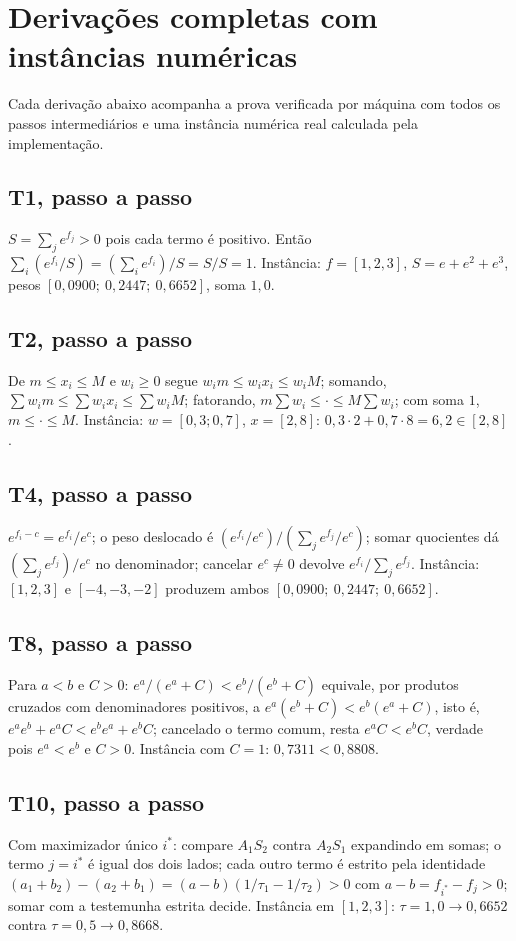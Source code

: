 \section{Derivações completas com instâncias numéricas}
Cada derivação abaixo acompanha a prova verificada por máquina com todos os passos intermediários e uma instância numérica real calculada pela implementação.
\subsection{T1, passo a passo}
$S=\sum_j e^{f_j}>0$ pois cada termo é positivo. Então $\sum_i(e^{f_i}/S)=(\sum_i e^{f_i})/S=S/S=1$. Instância: $f=[1,2,3]$, $S=e+e^2+e^3$, pesos $[0{,}0900;\ 0{,}2447;\ 0{,}6652]$, soma $1{,}0$.
\subsection{T2, passo a passo}
De $m\leq x_i\leq M$ e $w_i\geq0$ segue $w_im\leq w_ix_i\leq w_iM$; somando, $\sum w_im\leq\sum w_ix_i\leq\sum w_iM$; fatorando, $m\sum w_i\leq\cdot\leq M\sum w_i$; com soma $1$, $m\leq\cdot\leq M$. Instância: $w=[0{,}3;0{,}7]$, $x=[2,8]$: $0{,}3\cdot2+0{,}7\cdot8=6{,}2\in[2,8]$.
\subsection{T4, passo a passo}
$e^{f_i-c}=e^{f_i}/e^c$; o peso deslocado é $(e^{f_i}/e^c)/(\sum_je^{f_j}/e^c)$; somar quocientes dá $(\sum_je^{f_j})/e^c$ no denominador; cancelar $e^c\neq0$ devolve $e^{f_i}/\sum_je^{f_j}$. Instância: $[1,2,3]$ e $[-4,-3,-2]$ produzem ambos $[0{,}0900;\ 0{,}2447;\ 0{,}6652]$.
\subsection{T8, passo a passo}
Para $a<b$ e $C>0$: $e^a/(e^a+C)<e^b/(e^b+C)$ equivale, por produtos cruzados com denominadores positivos, a $e^a(e^b+C)<e^b(e^a+C)$, isto é, $e^ae^b+e^aC<e^be^a+e^bC$; cancelado o termo comum, resta $e^aC<e^bC$, verdade pois $e^a<e^b$ e $C>0$. Instância com $C=1$: $0{,}7311<0{,}8808$.
\subsection{T10, passo a passo}
Com maximizador único $i^*$: compare $A_1S_2$ contra $A_2S_1$ expandindo em somas; o termo $j=i^*$ é igual dos dois lados; cada outro termo é estrito pela identidade $(a_1+b_2)-(a_2+b_1)=(a-b)(1/\tau_1-1/\tau_2)>0$ com $a-b=f_{i^*}-f_j>0$; somar com a testemunha estrita decide. Instância em $[1,2,3]$: $\tau=1{,}0\to0{,}6652$ contra $\tau=0{,}5\to0{,}8668$.
